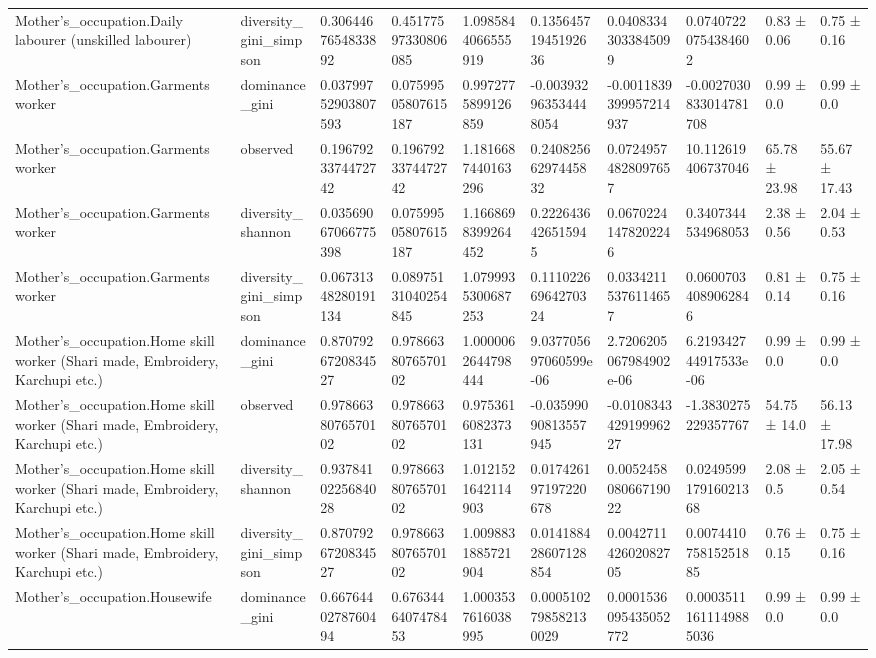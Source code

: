\begin{longtable}{llllllllll}
Mother’s\_occupation.Daily labourer (unskilled labourer) & diversity\_gini\_simpson & 0.3064467654833892 & 0.45177597330806085 & 1.0985844066555919 & 0.13564571945192636 & 0.04083343033845099 & 0.07407220754384602 & 0.83 ± 0.06 & 0.75 ± 0.16 \\
Mother’s\_occupation.Garments worker & dominance\_gini & 0.03799752903807593 & 0.07599505807615187 & 0.9972775899126859 & -0.003932963534448054 & -0.0011839399957214937 & -0.0027030833014781708 & 0.99 ± 0.0 & 0.99 ± 0.0 \\
Mother’s\_occupation.Garments worker & observed & 0.1967923374472742 & 0.1967923374472742 & 1.1816687440163296 & 0.24082566297445832 & 0.07249574828097657 & 10.112619406737046 & 65.78 ± 23.98 & 55.67 ± 17.43 \\
Mother’s\_occupation.Garments worker & diversity\_shannon & 0.03569067066775398 & 0.07599505807615187 & 1.1668698399264452 & 0.2226436426515945 & 0.06702241478202246 & 0.3407344534968053 & 2.38 ± 0.56 & 2.04 ± 0.53 \\
Mother’s\_occupation.Garments worker & diversity\_gini\_simpson & 0.06731348280191134 & 0.08975131040254845 & 1.0799935300687253 & 0.11102266964270324 & 0.03342115376114657 & 0.06007034089062846 & 0.81 ± 0.14 & 0.75 ± 0.16 \\
Mother’s\_occupation.Home skill worker (Shari made, Embroidery, Karchupi etc.) & dominance\_gini & 0.8707926720834527 & 0.9786638076570102 & 1.0000062644798444 & 9.037705697060599e-06 & 2.7206205067984902e-06 & 6.219342744917533e-06 & 0.99 ± 0.0 & 0.99 ± 0.0 \\
Mother’s\_occupation.Home skill worker (Shari made, Embroidery, Karchupi etc.) & observed & 0.9786638076570102 & 0.9786638076570102 & 0.9753616082373131 & -0.03599090813557945 & -0.010834342919996227 & -1.3830275229357767 & 54.75 ± 14.0 & 56.13 ± 17.98 \\
Mother’s\_occupation.Home skill worker (Shari made, Embroidery, Karchupi etc.) & diversity\_shannon & 0.9378410225684028 & 0.9786638076570102 & 1.0121521642114903 & 0.017426197197220678 & 0.005245808066719022 & 0.024959917916021368 & 2.08 ± 0.5 & 2.05 ± 0.54 \\
Mother’s\_occupation.Home skill worker (Shari made, Embroidery, Karchupi etc.) & diversity\_gini\_simpson & 0.8707926720834527 & 0.9786638076570102 & 1.0098831885721904 & 0.014188428607128854 & 0.004271142602082705 & 0.007441075815251885 & 0.76 ± 0.15 & 0.75 ± 0.16 \\
Mother’s\_occupation.Housewife & dominance\_gini & 0.6676440278760494 & 0.6763446407478453 & 1.0003537616038995 & 0.0005102798582130029 & 0.0001536095435052772 & 0.00035111611149885036 & 0.99 ± 0.0 & 0.99 ± 0.0 \\

\end{longtable}
